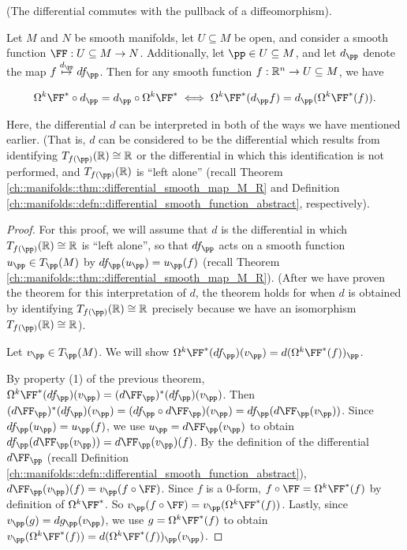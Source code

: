 \begin{theorem}
\label{ch::diff_forms::theorem::differential_commutes_with_diffeomorphism_pullback}
    (The differential commutes with the pullback of a diffeomorphism).
    
    Let $M$ and $N$ be smooth manifolds, let $U \subseteq M$ be open, and consider a smooth function $\FF:U \subseteq M \rightarrow N$. Additionally, let $\pp \in U \subseteq M$, and let $d_\pp$ denote the map $f \overset{d_\pp}{\mapsto} df_\pp$. Then for any smooth function ${f:\mathbb{R}^n \rightarrow U \subseteq M}$, we have
        
    \begin{align*}
        \Omega ^k \FF^* \circ d_\pp = d_\pp \circ \Omega ^k \FF^* \iff \Omega ^k \FF^*(d_\pp f) = d_\pp ( \Omega ^k \FF^*(f) ).
    \end{align*}
        
    Here, the differential $d$ can be interpreted in both of the ways we have mentioned earlier. (That is, $d$ can be considered to be the differential which results from identifying $T_{f(\pp)}(\R) \cong \R$ or the differential in which this identification is not performed, and $T_{f(\pp)}(\R)$ is ``left alone'' (recall Theorem \ref{ch::manifolds::thm::differential_smooth_map_M_R} and Definition \ref{ch::manifolds::defn::differential_smooth_function_abstract}, respectively).
\end{theorem}

\begin{proof}
        For this proof, we will assume that $d$ is the differential in which $T_{f(\pp)}(\R) \cong \R$ is ``left alone'', so that $df_\pp$ acts on a smooth function $u_\pp \in T_\pp(M)$ by $df_\pp(u_\pp) = u_\pp(f)$ (recall Theorem \ref{ch::manifolds::thm::differential_smooth_map_M_R}). (After we have proven the theorem for this interpretation of $d$, the theorem holds for when $d$ is obtained by identifying $T_{f(\pp)}(\R) \cong \R$ precisely because we have an isomorphism $T_{f(\pp)}(\R) \cong \R$).
        
        Let $v_\pp \in T_\pp(M)$. We will show $\Omega^k \FF^*(df_\pp)(v_\pp) = d(\Omega^k \FF^*(f))_\pp$.
        
        By property (1) of the previous theorem, $\Omega^k \FF^*(df_\pp)(v_\pp) = (d \FF_\pp)^*(df_\pp)(v_\pp)$. Then $(d \FF_\pp)^*(df_\pp)(v_\pp) = {(df_\pp \circ d\FF_\pp)(v_\pp) = df_\pp(d\FF_\pp(v_\pp))}$. Since $df_\pp(u_\pp) = u_\pp(f)$, we use $u_\pp = d\FF_\pp(v_\pp)$ to obtain  $df_\pp(d\FF_\pp(v_\pp)) = d\FF_\pp(v_\pp)(f)$. By the definition of the differential $d\FF_\pp$ (recall Definition \ref{ch::manifolds::defn::differential_smooth_function_abstract}), $d\FF_\pp(v_\pp)(f) = v_\pp(f \circ \FF)$. Since $f$ is a $0$-form, $f \circ \FF = \Omega^k \FF^*(f)$ by definition of $\Omega^k \FF^*$. So $v_\pp(f \circ \FF) = v_\pp(\Omega^k \FF^*(f))$. Lastly, since $v_\pp(g) = dg_\pp(v_\pp)$, we use $g = \Omega^k \FF^*(f)$ to obtain $v_\pp(\Omega^k \FF^*(f)) = d(\Omega^k \FF^*(f))_\pp(v_\pp)$.
\end{proof}

